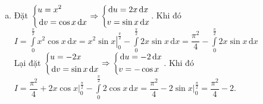 \begin{bt}
{\begin{enumerate}[a.]
$I= \displaystyle \int _0 ^1 \dfrac{u \mathrm{\,d}u}{(u+1)^2}=\displaystyle \int\limits_0^1 \left( \dfrac{1}{u+1}-\dfrac{1}{(u+1)^2} \right) \mathrm{\,d}u = \left. \left( \ln \vert u+1 \vert - \dfrac{1}{u+1} \right) \right|_0^1 = \ln 2 +\dfrac{1}{2}$.
\item Đặt $\left\{\begin{aligned}&u=x^2\\& \mathrm{\,d}v=\cos x \mathrm{\,d}x\end{aligned}\right. \Rightarrow \left\{\begin{aligned}& \mathrm{\,d}u = 2x \mathrm{\,d}x\\& v = \sin x \mathrm{\,d}x\end{aligned}\right.$. Khi đó\\
$I=\displaystyle \int \limits_0^{\tfrac{\pi}{2}} x^2 \cos x \mathrm{\,d}x = \left. x^2\sin x \right|_0^{\tfrac{\pi}{2}} - \displaystyle \int \limits_0^{\tfrac{\pi}{2}} 2x \sin x \mathrm{\,d}x= \dfrac{\pi^2}{4}-\displaystyle \int \limits_0^{\tfrac{\pi}{2}} 2x \sin x \mathrm{\,d}x$\\
Lại đặt $\left\{\begin{aligned}&u=-2x\\& \mathrm{\,d}v=\sin x \mathrm{\,d}x\end{aligned}\right. \Rightarrow \left\{\begin{aligned}&\mathrm{\,d}u=-2\mathrm{\,d}x\\&v=-\cos x\end{aligned}\right.$. Khi đó\\
$I=\dfrac{\pi^2}{4} + 2x \cos x \Big|_0^{\tfrac{\pi}{2}} -\displaystyle \int \limits_0^{\tfrac{\pi}{2}} 2\cos x \mathrm{\,d}x=\dfrac{\pi^2}{4}-2\sin x \Big|_0^{\tfrac{\pi}{2}}=\dfrac{\pi^2}{4}-2$.
\end{enumerate}
}
\end{bt}
